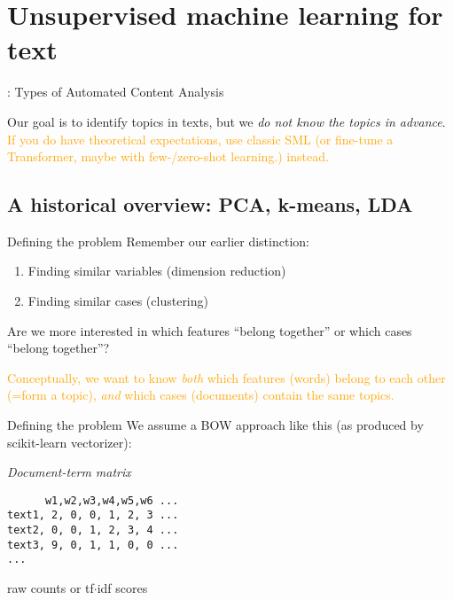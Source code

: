 \section[Unsupervised ML]{Unsupervised machine learning for text}





\begin{frame}{\cite{Boumans2016}: Types of Automated Content Analysis}
\end{frame}



\begin{frame}[standout]
Our goal is to identify topics in texts, but we \emph{do not know the topics in advance}.\\ \textcolor{orange}{If you do have theoretical expectations, use classic SML (or fine-tune a Transformer, maybe with few-/zero-shot learning.) instead.}

\end{frame}




\subsection{A historical overview: PCA, k-means, LDA}


\begin{frame}{Defining the problem}
Remember our earlier distinction:
\begin{enumerate}
\item Finding similar variables (dimension reduction)
\item Finding similar cases (clustering)
\end{enumerate}

\pause

Are we more interested in which features ``belong together'' or which cases ``belong together''? 

\pause

\textcolor{orange}{Conceptually, we want to know \emph{both} which features (words) belong to each other (=form a topic),  \emph{and} which cases (documents) contain the same topics.}

\end{frame}

\begin{frame}[fragile]{Defining the problem}
We assume a BOW approach like this (as produced by scikit-learn vectorizer):
    
\emph{Document-term matrix}
\begin{lstlisting}
      w1,w2,w3,w4,w5,w6 ...
text1, 2, 0, 0, 1, 2, 3 ...
text2, 0, 0, 1, 2, 3, 4 ...
text3, 9, 0, 1, 1, 0, 0 ...
...
\end{lstlisting}
    {\small{raw counts or tf$\cdot$idf scores}}

 \end{frame}
  

